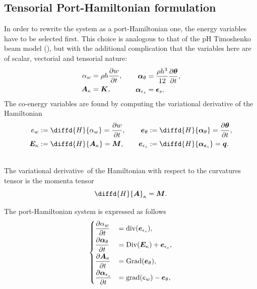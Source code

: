 \documentclass{ifacconf}
\begin{document}
\subsection{Tensorial Port-Hamiltonian formulation}
In order to rewrite the system as a port-Hamiltonian one, the energy variables have to be selected first. This  choice is analogous to that of the pH Timoshenko beam  model (\cite{BookZwart}), but with the additional complication that the variables here are of scalar, vectorial and tensorial nature:
\begin{equation}
\begin{aligned}
\alpha_w &= \rho h \diffp{w}{t}, \\
\bm{A}_{\kappa} &= \bm{K}, \\
\end{aligned} \qquad
\begin{aligned}
\bm\alpha_{\theta} &= \frac{\rho h^3}{12} \diffp{\bm{\theta}}{t}, \\
\bm\alpha_{\epsilon_s} &= \bm{\epsilon}_s. \\
\end{aligned}
\end{equation}
The co-energy variables are found by computing the variational derivative of the Hamiltonian
\begin{equation}
\begin{aligned}
e_w &:= \diffd{H}{\alpha_w} = \diffp{w}{t},  \\
\bm{E}_{\kappa} &:= \diffd{H}{\bm{A}_{\kappa}} = \bm{M}, \\
\end{aligned} \qquad
\begin{aligned}
\bm{e}_{\theta} &:= \diffd{H}{\bm\alpha_{\theta}} = \diffp{\bm{\theta}}{t}, \\
\bm{e}_{\epsilon_s} &:= \diffd{H}{\bm{\alpha}_{\bm{\epsilon}_s}} = \bm{q}. \\
\end{aligned}
\end{equation}
\begin{prop} \noindent \\
	The variational derivative~of the Hamiltonian with respect to the curvatures tensor is the momenta tensor
	 \[ \diffd{H}{\bm{A}}_{\kappa} = \bm{M}.\]
\end{prop}
The port-Hamiltonian system is expressed as follows 
\begin{equation}
\begin{cases}
\displaystyle\diffp{\alpha_w}{t} &= \mathrm{div}(\bm{e}_{\epsilon_s}), \vspace{1mm} \\
\displaystyle\diffp{\bm\alpha_\theta}{t} &= \mathrm{Div}( \bm{E}_{\kappa}) + \bm{e}_{\epsilon_s}, \vspace{1mm} \\
\displaystyle\diffp{\bm{A}_\kappa}{t} &= \mathrm{Grad}(\bm{e}_{\theta}), \vspace{1mm} \\
\displaystyle\diffp{ \bm\alpha_{\epsilon_s} }{t} &= \mathrm{grad}(e_w) - \bm{e}_{\theta},
\end{cases}
\end{equation}
\end{document}
